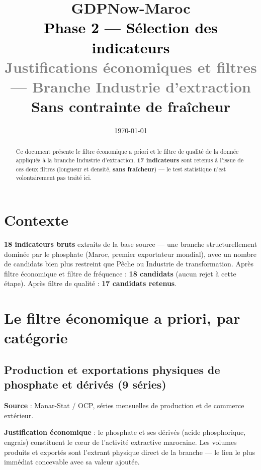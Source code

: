 \documentclass[11pt,a4paper]{article}
\title{\vspace{-1.3cm}\textcolor{bleuprincip}{\Huge\bfseries GDPNow-Maroc}\\[0.3cm]
\textcolor{black}{\Large Phase 2 --- Sélection des indicateurs}\\[0.15cm]
\textcolor{gray}{\large Justifications économiques et filtres --- Branche Industrie d'extraction}\\[0.1cm]
\textcolor{orangealerte}{\normalsize Sans contrainte de fraîcheur}}
\author{}
\date{\today}
\begin{document}
\maketitle
\thispagestyle{empty}

\begin{abstract}
\noindent Ce document présente le filtre économique a priori et le filtre de qualité de la donnée appliqués à la branche Industrie d'extraction. \textbf{17 indicateurs} sont retenus à l'issue de ces deux filtres (longueur et densité, \textbf{sans fraîcheur}) --- le test statistique n'est volontairement pas traité ici.
\end{abstract}

\tableofcontents
\vspace{0.3cm}

\section{Contexte}

\begin{fichebox}
\textbf{18 indicateurs bruts} extraits de la base source --- une branche structurellement dominée par le phosphate (Maroc, premier exportateur mondial), avec un nombre de candidats bien plus restreint que Pêche ou Industrie de transformation. Après filtre économique et filtre de fréquence : \textbf{18 candidats} (aucun rejet à cette étape). Après filtre de qualité : \textbf{17 candidats retenus}.
\end{fichebox}

\section{Le filtre économique a priori, par catégorie}

\subsection{Production et exportations physiques de phosphate et dérivés (9 séries)}

\textbf{Source} : Manar-Stat / OCP, séries mensuelles de production et de commerce extérieur.

\textbf{Justification économique} : le phosphate et ses dérivés (acide phosphorique, engrais) constituent le cœur de l'activité extractive marocaine. Les volumes produits et exportés sont l'extrant physique direct de la branche --- le lien le plus immédiat concevable avec sa valeur ajoutée.
\end{document}
